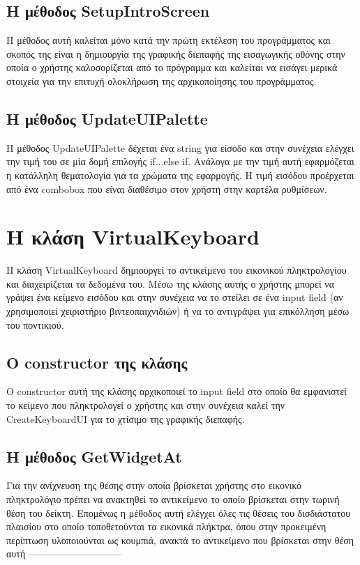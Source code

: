 \subsection{Η μέθοδος SetupIntroScreen}
Η μέθοδος αυτή καλείται μόνο κατά την πρώτη εκτέλεση του προγράμματος και σκοπός της
είναι η δημιουργία της γραφικής διεπαφής της εισαγωγικής οθόνης στην οποία ο χρήστης
καλοσορίζεται από το πρόγραμμα και καλείται να εισάγει μερικά στοιχεία για την επιτυχή
ολοκλήρωση της αρχικοποίησης του προγράμματος. 


\subsection{Η μέθοδος UpdateUIPalette}
Η μέθοδος UpdateUIPalette δέχεται ένα string για είσοδο και στην συνέχεια
ελέγχει την τιμή του σε μία δομή επιλογής if...else if. Ανάλογα με την τιμή αυτή εφαρμόζεται
η κατάλληλη θεματολογία για τα χρώματα της εφαρμογής. Η τιμή εισόδου προέρχεται από
ένα combobox που είναι διαθέσιμο στον χρήστη στην καρτέλα ρυθμίσεων.






\section{Η κλάση VirtualKeyboard}

Η κλάση VirtualKeyboard δημιουργεί το αντικείμενο του εικονικού πληκτρολογίου και διαχειρίζεται
τα δεδομένα του. Μέσω της κλάσης αυτής ο χρήστης μπορεί να γράψει ένα κείμενο εισόδου και στην
συνέχεια να το στείλει σε ένα input field (αν χρησιμοποιεί χειριστήριο βιντεοπαιχνιδιών) ή να 
το αντιγράψει για επικόλληση μέσω του ποντικιού.  


\subsection{Ο constructor της κλάσης}
Ο constructor αυτή της κλάσης αρχικοποιεί το input field στο οποίο θα εμφανιστεί το κείμενο που
πληκτρολογεί ο χρήστης και στην συνέχεια καλεί την CreateKeyboardUI για το χτίσιμο της γραφικής
διεπαφής.


\subsection{Η μέθοδος GetWidgetAt}
Για την ανίχνευση της θέσης στην οποία βρίσκεται χρήστης στο εικονικό πληκτρολόγιο πρέπει να
ανακτηθεί το αντικείμενο το οποίο βρίσκεται στην τωρινή θέση του δείκτη. Επομένως η μέθοδος
αυτή ελέγχει όλες τις θέσεις του δισδιάστατου πλαισίου στο οποίο τοποθετούνται τα εικονικά
πλήκτρα, όπου στην προκειμένη περίπτωση υλοποιούνται ως κουμπιά, ανακτά το αντικείμενο που
βρίσκεται στην θέση αυτή -----------------------------

